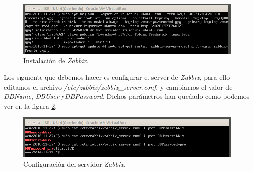 \documentclass[a4paper,titlepage,12pt]{scrartcl}	%
\numberwithin{figure}{section} %
\numberwithin{table}{section} %
\begin{document}
	\begin{figure}[H]
		\includegraphics[width=\linewidth]{./Imagenes/O4-2.png}
		\vspace{-0.5cm}
		\caption[Instalación de \textit{Zabbix}.]{Instalación de \textit{Zabbix}.}
		\label{O4-2}
	\end{figure}
	
	Los siguiente que debemos hacer es configurar el server de \textit{Zabbix}, para ello editamos el archivo \textit{/etc/zabbix/zabbix\_server.conf}, y cambiamos el valor de \textit{DBName}, \textit{DBUser} y\textit{DBPassword}. Dichos parámetros han quedado como podemos ver en la figura \ref{O4-3}.
	
	\begin{figure}[H]
		\includegraphics[width=\linewidth]{./Imagenes/O4-3.png}
		\vspace{-0.5cm}
		\caption[Configuración del servidor de \textit{Zabbix}.]{Configuración del servidor \textit{Zabbix}.}
		\label{O4-3}
	\end{figure}
	
\end{document}
